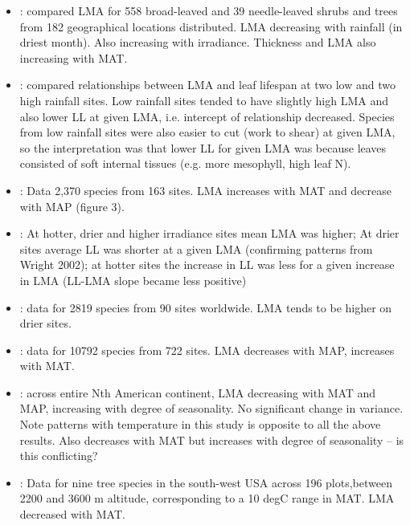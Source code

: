 \documentclass[a4paper,11pt]{article}
\begin{document}
\begin{itemize}
\item \citet{Niinemets-2001}: compared LMA for 558 broad-leaved and 39 needle-leaved shrubs and trees from 182 geographical locations distributed. LMA decreasing with rainfall (in driest month). Also increasing with irradiance. Thickness and LMA also increasing with MAT.

\item \citet{Wright-2002}: compared relationships between LMA and leaf lifespan at two low and two high rainfall sites. Low rainfall sites tended to have slightly high LMA and also lower LL at given LMA, i.e. intercept of relationship decreased. Species from low rainfall sites were also easier to cut (work to shear) at given LMA, so the interpretation was that lower LL for given LMA was because leaves consisted of soft internal tissues (e.g. more mesophyll, high leaf N).

\item \citet{Wright-2004}: Data 2,370 species from 163 sites. LMA increases with MAT and decrease with MAP (figure 3).

\item \citet{Wright-2005}: At hotter, drier and higher irradiance sites mean LMA was higher; At drier sites average LL was shorter at a given LMA (confirming patterns from Wright 2002); at hotter sites the increase in LL was less for a given increase in LMA (LL-LMA slope became less positive)

\item \citet{Onoda-2011}: data for 2819 species from 90 sites worldwide. LMA tends to be higher on drier sites.

\item \citet{Moles-2014}: data for 10792 species from 722 sites. LMA decreases with MAP, increases with MAT.

\item \citet{Simova-2014}: across entire Nth American continent, LMA decreasing with MAT and MAP, increasing with degree of seasonality. No significant change in variance. Note patterns with temperature in this study is opposite to all the above results. Also decreases with MAT but increases with degree of seasonality -- is this conflicting?

\item \citet{Laughlin-2012}: Data for nine tree species in the south-west USA across 196 plots,between 2200 and 3600 m altitude, corresponding to a 10 degC range in MAT. LMA decreased with MAT.


\end{itemize}
\end{document}
